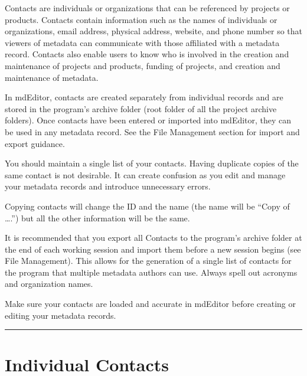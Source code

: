 \documentclass[
]{book}
\makeatletter
\newenvironment{kframe}{%
\medskip{}
\setlength{\fboxsep}{.8em}
 \def\at@end@of@kframe{}%
 \ifinner\ifhmode%
  \def\at@end@of@kframe{\end{minipage}}%
  \begin{minipage}{\columnwidth}%
 \fi\fi%
 \def\FrameCommand##1{\hskip\@totalleftmargin \hskip-\fboxsep
 \colorbox{shadecolor}{##1}\hskip-\fboxsep
     \hskip-\linewidth \hskip-\@totalleftmargin \hskip\columnwidth}%
 \MakeFramed {\advance\hsize-\width
   \@totalleftmargin\z@ \linewidth\hsize
   \@setminipage}}%
 {\par\unskip\endMakeFramed%
 \at@end@of@kframe}
\newenvironment{rmdblock}[1]
  {
  \begin{itemize}
  \renewcommand{\labelitemi}{
    \raisebox{-.7\height}[0pt][0pt]{
      {\setkeys{Gin}{width=3em,keepaspectratio}\texttt{[image: images/\#1]}}
    }
  }
  \setlength{\fboxsep}{1em}
  \begin{kframe}
  \item
  }
  {
  \end{kframe}
  \end{itemize}
  }
\newenvironment{rmdcaution}
  {\begin{rmdblock}{caution}}
  {\end{rmdblock}}
\newenvironment{rmdtip}
  {\begin{rmdblock}{tip}}
  {\end{rmdblock}}
\makeatother
\begin{document}
Contacts are individuals or organizations that can be referenced by projects or products. Contacts contain information such as the names of individuals or organizations, email address, physical address, website, and phone number so that viewers of metadata can communicate with those affiliated with a metadata record. Contacts also enable users to know who is involved in the creation and maintenance of projects and products, funding of projects, and creation and maintenance of metadata.

In mdEditor, contacts are created separately from individual records and are stored in the program's archive folder (root folder of all the project archive folders). Once contacts have been entered or imported into mdEditor, they can be used in any metadata record. See the File Management section for import and export guidance.

You should maintain a single list of your contacts. Having duplicate copies of the same contact is not desirable. It can create confusion as you edit and manage your metadata records and introduce unnecessary errors.

Copying contacts will change the ID and the name (the name will be ``Copy of \ldots{}.'') but all the other information will be the same.

\begin{rmdtip}
It is recommended that you export all Contacts to the program's archive
folder at the end of each working session and import them before a new
session begins (see File Management). This allows for the generation of
a single list of contacts for the program that multiple metadata authors
can use. Always spell out acronyms and organization names.
\end{rmdtip}

\begin{rmdcaution}
Make sure your contacts are loaded and accurate in mdEditor before
creating or editing your metadata records.
\end{rmdcaution}

\begin{center}\rule{0.5\linewidth}{\linethickness}\end{center}

\hypertarget{individual-contacts}{%
\section*{Individual Contacts}\label{individual-contacts}}
\end{document}
